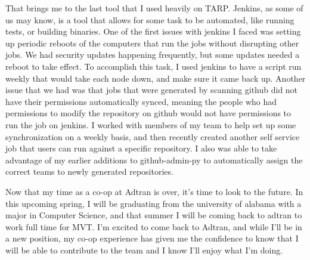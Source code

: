 \documentclass[12pt, letterpaper]{article}
\begin{document}
\par
That brings me to the last tool that I used heavily on TARP. Jenkins, as some of us may know,
is a tool that allows for some task to be automated, like running tests, or building binaries.
One of the first issues with jenkins I faced was setting up periodic reboots of the
computers that run the jobs without disrupting other jobs. We had security updates
happening frequently, but some updates needed a reboot to take effect. To accomplish this task,
I used jenkins to have a script run weekly that would take each node down, and make sure
it came back up. Another issue that we had was that jobs that were generated by
scanning github did not have their permissions automatically synced, meaning the people who had permissions to modify the repository on github
would not have permissions to run the job on jenkins. I worked with members of my team to help set up some synchronization on a weekly basis,
and then recently created another self service job that users can run against
a specific repository. I also was able to take advantage of my earlier additions to github-admin-py to automatically assign the correct teams
to newly generated repositories.

\par
Now that my time as a co-op at Adtran is over, it's time to look to the future.
In this upcoming spring, I will be graduating from the university of alabama with
a major in Computer Science, and that summer I will be coming back to adtran to work full time for MVT. I'm excited to
come back to Adtran, and while I'll be in a new position, my co-op experience has given me
the confidence to know that I will be able to contribute to the team and I know I'll enjoy what I'm doing.
\end{document}
